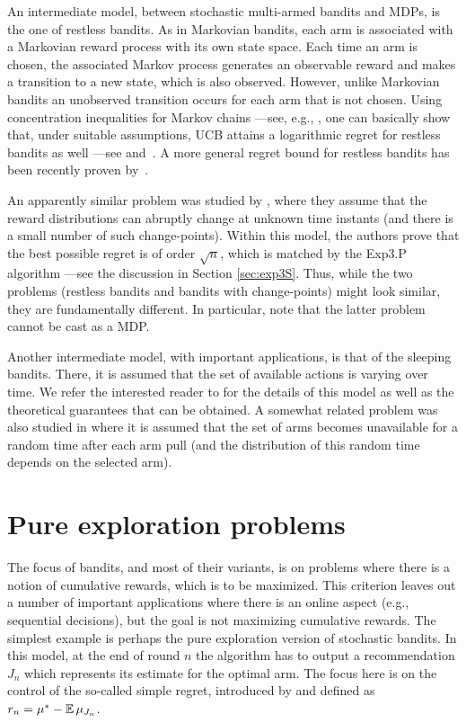 An intermediate model, between stochastic multi-armed bandits and MDPs, is the one of restless bandits. As in Markovian bandits, each arm is associated with a Markovian reward process with its own state space. Each time an arm is chosen, the associated Markov process generates an observable reward and makes a transition to a new state, which is also observed. However, unlike Markovian bandits an unobserved transition occurs for each arm that is not chosen. Using concentration inequalities for Markov chains ---see, e.g., \cite{Lez98}, one can basically show that, under suitable assumptions, UCB attains a logarithmic regret for restless bandits as well ---see \cite{TL11} and~\cite{filippi2011optimally}. A more general regret bound for restless bandits has been recently proven by~\cite{ortner2012regret}.

An apparently similar problem was studied by \cite{GM11}, where they assume that the reward distributions can abruptly change at unknown time instants (and there is a small number of such change-points). Within this model, the authors prove that the best possible regret is of order $\sqrt{n}$, which is matched by the Exp3.P algorithm ---see the discussion in Section \ref{sec:exp3S}. Thus, while the two problems (restless bandits and bandits with change-points) might look similar, they are fundamentally different. In particular, note that the latter problem cannot be cast as a MDP.

Another intermediate model, with important applications, is that of the sleeping bandits. There, it is assumed that the set of available actions is varying over time. We refer the interested reader to \cite{KNS10, KMB09, slivkins2009contextual, KS12} for the details of this model as well as the theoretical guarantees that can be obtained. A somewhat related problem was also studied in \cite{GKSS07} where it is assumed that the set of arms becomes unavailable for a random time after each arm pull (and the distribution of this random time depends on the selected arm).

\section{Pure exploration problems}
The focus of bandits, and most of their variants, is on problems where there is a notion of cumulative rewards, which is to be maximized. This criterion leaves out a number of important applications where there is an online aspect (e.g., sequential decisions), but the goal is not maximizing cumulative rewards. The simplest example is perhaps the pure exploration version of stochastic bandits. In this model, at the end of round $n$ the algorithm has to output a recommendation $J_n$ which represents its estimate for the optimal arm. The focus here is on the control of the so-called simple regret, introduced by \cite{BMS09, BMS11} and defined as $r_n = \mu^* - \mathbb{E}\,\mu_{J_n}$.

